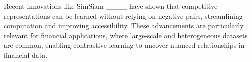 Recent innovations like SimSiam ____ have shown that competitive representations can be learned without relying on negative pairs, streamlining computation and improving accessibility. These advancements are particularly relevant for financial applications, where large-scale and heterogeneous datasets are common, enabling contrastive learning to uncover nuanced relationships in financial data.


